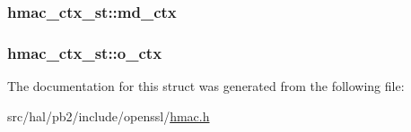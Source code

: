 \subsubsection[{\texorpdfstring{md\+\_\+ctx}{md_ctx}}]{ hmac\+\_\+ctx\+\_\+st\+::md\+\_\+ctx}\hypertarget{structhmac__ctx__st_a47d4d66a70519722df931e144dbc77a0}{}\label{structhmac__ctx__st_a47d4d66a70519722df931e144dbc77a0}
\subsubsection[{\texorpdfstring{o\+\_\+ctx}{o_ctx}}]{ hmac\+\_\+ctx\+\_\+st\+::o\+\_\+ctx}\hypertarget{structhmac__ctx__st_a9ac033d3f121ddbb6329e68825318ad8}{}\label{structhmac__ctx__st_a9ac033d3f121ddbb6329e68825318ad8}


The documentation for this struct was generated from the following file\+:\begin{DoxyCompactItemize}
\item 
src/hal/pb2/include/openssl/\hyperlink{hmac_8h}{hmac.\+h}\end{DoxyCompactItemize}

